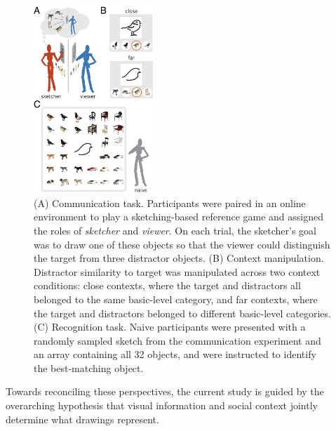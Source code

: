 \documentclass[9pt,twocolumn,twoside]{pnas-new}
\begin{document}

\begin{figure}[htbp]
\centering
\includegraphics[width=0.4\textwidth]{figures/1_task_display_alt.png}
\caption{(A) Communication task. Participants were paired in an online environment to play a sketching-based reference game and assigned the roles of \textit{sketcher} and \textit{viewer}. On each trial, the sketcher's goal was to draw one of these objects so that the viewer could distinguish the target from three distractor objects. (B) Context manipulation. Distractor similarity to target was manipulated across two context conditions: close contexts, where the target and distractors all belonged to the same basic-level category, and far contexts, where the target and distractors belonged to different basic-level categories. (C) Recognition task. Naive participants were presented with a randomly sampled sketch from the communication experiment and an array containing all 32 objects, and were instructed to identify the best-matching object.}
\label{task_display}
\end{figure}

Towards reconciling these perspectives, the current study is guided by the overarching hypothesis that visual information and social context jointly determine what drawings represent. 
\end{document}
